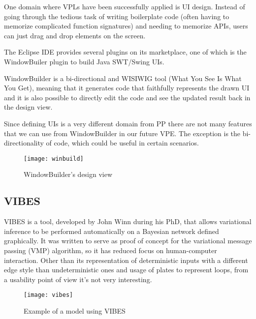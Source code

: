 One domain where VPLs have been successfully applied is UI design. Instead of
going through the tedious task of writing boilerplate code (often having to
memorize complicated function signatures) and needing to memorize APIs, users
can just drag and drop elements on the screen.

The Eclipse IDE provides several plugins on its marketplace, one of which is the
WindowBuiler plugin \cite{winbuild} to build Java SWT/Swing UIs.

WindowBuilder is a bi-directional and WISIWIG tool (What You See Is What You Get), meaning
that it generates code that faithfully represents the drawn UI and it is also possible to
directly edit the code and see the updated result back in the design view.

Since defining UIs is a very different domain from PP there are not many features
that we can use from WindowBuilder in our future VPE. The exception is the
bi-directionality of code, which could be useful in certain scenarios.

\begin{figure}[t]
  \begin{center}
    \leavevmode
    \texttt{[image: winbuild]}
    \caption{WindowBuilder's design view \cite{winbuild}}
    \label{fig:winbuild}
  \end{center}
\end{figure}

\subsection{VIBES}
\label{sec:vibes}

VIBES is a tool, developed by John Winn during his PhD, that allows variational
inference to be performed automatically on a Bayesian network \cite{Winn2005}
defined graphically.
It was written to serve as proof of concept for the variational message passing (VMP)
algorithm, so it has reduced focus on human-computer interaction. Other than its representation
of deterministic inputs with a different edge style than undeterministic ones and
usage of plates to represent loops, from a usability point of view it's not very interesting.

\begin{figure}[t]
  \begin{center}
    \leavevmode
    \texttt{[image: vibes]}
    \caption{Example of a model using VIBES \cite{Winn2005}}
    \label{fig:vibes}
  \end{center}
\end{figure}

